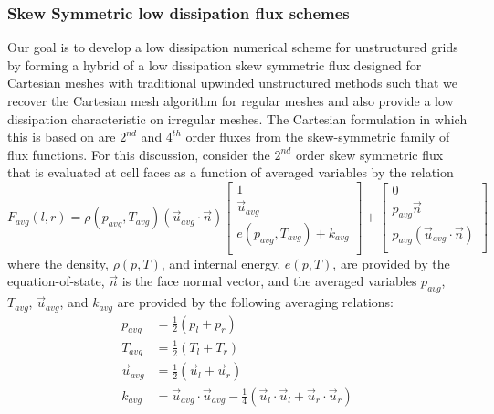 \subsubsection{Skew Symmetric low dissipation flux schemes}


Our goal is to develop a low dissipation numerical scheme for
unstructured grids by forming a hybrid of a low dissipation skew
symmetric flux designed for Cartesian meshes with traditional upwinded
unstructured methods such that we recover the Cartesian mesh algorithm
for regular meshes and also provide a low dissipation characteristic
on irregular meshes.  The Cartesian formulation in which this is based on 
are $2^{nd}$ and $4^{th}$ order fluxes from the skew-symmetric family
of flux functions.  For this discussion, consider the $2^{nd}$ order
skew symmetric flux that is evaluated at cell faces as a function of
averaged variables by the relation
\begin{equation}
F_{avg}(l,r) = \rho(p_{avg},T_{avg}) \left(\vec{u}_{avg}\cdot\vec{n}\right)
\label{eq:cflux}
\begin{bmatrix}
  1\\
\vec{u}_{avg}\\
e(p_{avg},T_{avg}) + k_{avg}\\
\end{bmatrix} +
\begin{bmatrix}
0\\
p_{avg} \vec{n} \\
p_{avg} \left(\vec{u}_{avg}\cdot \vec{n}\right)\\
\end{bmatrix}
\end{equation}
where the density, $\rho(p,T)$, and internal energy, $e(p,T)$, are
provided by the equation-of-state, $\vec{n}$ is the face normal
vector, and the averaged variables $p_{avg}$, $T_{avg}$,
$\vec{u}_{avg}$, and $k_{avg}$ are provided by the following averaging
relations:
\begin{equation}
\begin{aligned}
p_{avg} &= \frac{1}{2}\left(p_l + p_r\right)\\
T_{avg} &= \frac{1}{2}\left(T_l + T_r\right)\\
\vec{u}_{avg} & = \frac{1}{2}\left(\vec{u}_l + \vec{u}_r\right)\\
k_{avg} &= \vec{u}_{avg}\cdot\vec{u}_{avg}-\frac{1}{4} \left( \vec{u}_l\cdot\vec{u}_l + \vec{u}_r\cdot\vec{u}_r\right)\\
\label{eq:averaging}
\end{aligned}
\end{equation}

